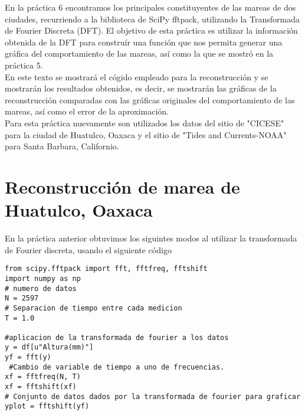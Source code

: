 \documentclass[12pt]{article}
\begin{document}
En la práctica 6 encontramos los principales constituyentes de las mareas de dos ciudades, recurriendo a la biblioteca de SciPy fftpack, utilizando la Transformada de Fourier Discreta (DFT). El objetivo de esta práctica es utilizar la información obtenida de la DFT para construír una función que nos permita generar una  gráfica del comportamiento de las mareas, así como la que se mostró en la práctica 5.\\
En este texto se mostrará el cógido empleado para la reconstrucción y se mostrarán los resultados obtenidos, es decir, se mostrarán las gráficas de la reconstrucción comparadas con las gráficas originales del comportamiento de las mareas, así como el error de la aproximación.\\
Para esta práctica nuevamente son utilizados los datos del sitio de "CICESE" para la ciudad de Huatulco, Oaxaca y el sitio de "Tides and Currents-NOAA" para Santa Barbara, Californio.






\newpage 


\section*{Reconstrucción de marea de Huatulco, Oaxaca}


En la práctica anterior obtuvimos los siguintes modos al utilizar la transformada de Fourier discreta, usando el siguiente código

\begin{verbatim}
from scipy.fftpack import fft, fftfreq, fftshift
import numpy as np
# numero de datos
N = 2597
# Separacion de tiempo entre cada medicion
T = 1.0

#aplicacion de la transformada de fourier a los datos
y = df[u"Altura(mm)"]
yf = fft(y)
 #Cambio de variable de tiempo a uno de frecuencias.
xf = fftfreq(N, T)
xf = fftshift(xf)
# Conjunto de datos dados por la transformada de fourier para graficar
yplot = fftshift(yf)
\end{verbatim}
\end{document}
